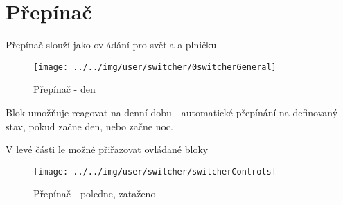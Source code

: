
\section{Přepínač}

Přepínač slouží jako ovládání pro světla a plničku

\begin{figure}[!ht]\centering
\texttt{[image: ../../img/user/switcher/0switcherGeneral]}

\caption{Přepínač - den}
\label{fig:user_switcher_0switcherGeneral}

\end{figure}

\FloatBarrier

Blok umožňuje reagovat na denní dobu - automatické přepínání na definovaný stav, pokud začne den, nebo začne noc.

V levé části le možné přiřazovat ovládané bloky

\begin{figure}[!ht]\centering
\texttt{[image: ../../img/user/switcher/switcherControls]}

\caption{Přepínač - poledne, zataženo}
\label{fig:user_switcher_switcherControls}

\end{figure}


\FloatBarrier